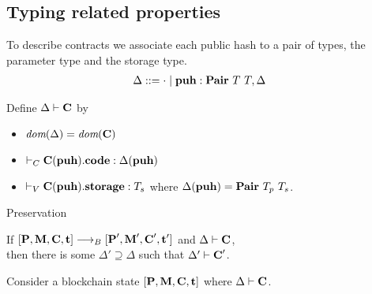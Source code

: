 \documentclass[a4paper]{llncs}
\begin{document}
\subsection{Typing related properties}

To describe contracts we associate each public hash to a pair of
types, the parameter type and the storage type.
\begin{align*}
  \Delta & ::= \cdot \mid \textbf{puh}: \textbf{Pair}\ T\ T, \Delta
\end{align*}

Define $ \Delta \vdash \textbf{C}$ by
\begin{itemize}
\item $\textit{dom} (\Delta) = \textit{dom} (\textbf{C})$
\item $\vdash_C\textbf{C} (\textbf{puh}).\textbf{code} : \Delta (\textbf{puh})$
\item $\vdash_V\textbf{C} (\textbf{puh}).\textbf{storage}: T_s$ where
  $\Delta (\PUH) = \TPAIR\ \TYPE_p\ \TYPE_s$. 
\end{itemize}

Preservation

If $[\textbf{P}, \textbf{M}, \textbf{C}, \textbf{t}] \stackrel{{}}\longrightarrow_B{}
[\textbf{P}', \textbf{M}', \textbf{C}', \textbf{t}']$
and $\Delta \vdash \textbf{C}$, \\
then
there is some $\Delta' \supseteq \Delta$ such that $\Delta' \vdash
\textbf{C}'$. 

Consider a blockchain state  $[\textbf{P}, \textbf{M}, \textbf{C},
\textbf{t}]$ where $\Delta \vdash \textbf{C}$.
\end{document}
